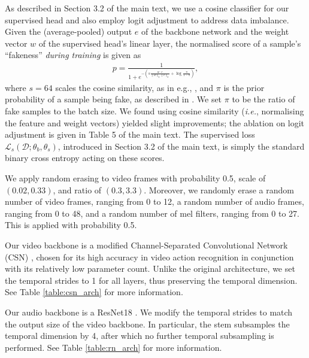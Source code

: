 \documentclass[10pt,twocolumn,letterpaper]{article}
\begin{document}
\begin{description}[wide,itemindent=\labelsep]
\item[Supervised loss details.] As described in Section 3.2 of the main text, we use a cosine classifier for our supervised head and also employ logit adjustment \cite{menon2020long} to address data imbalance. Given the (average-pooled) output $e$ of the backbone network and the weight vector $w$ of the supervised head's linear layer, the normalised score of a sample's ``fakeness'' \textit{during training} is given as 
\begin{align}
    p = \frac{1}{1 + e^{-\left(s\frac{w\cdot e}{\|w\|_2\|e\|_2} + \log\frac{\pi}{1 - \pi}\right)}},
\end{align}
where $s=64$ scales the cosine similarity, as in e.g., \cite{wang2017normface}, and $\pi$ is the prior probability of a sample being fake, as described in \cite{menon2020long}. We set $\pi$ to be the ratio of fake samples to the batch size. We found using cosine similarity (\textit{i.e.}, normalising the feature and weight vectors) yielded slight improvements; the ablation on logit adjustment is given in Table 5 of the main text. The supervised loss $\mathcal{L}_s(\mathcal{D}; \theta_b, \theta_s)$, introduced in Section 3.2 of the main text, is simply the standard binary cross entropy acting on these scores.

\item[Random masking.] We apply random erasing to video frames with probability 0.5, scale of $(0.02, 0.33)$, and ratio of $(0.3, 3.3)$. Moreover, we randomly erase a random number of video frames, ranging from 0 to 12, a random number of audio frames, ranging from 0 to 48, and a random number of mel filters, ranging from 0 to 27. This is applied with probability 0.5.

\item[Backbones.] Our video backbone is a modified Channel-Separated Convolutional Network (CSN) \cite{tran2019video}, chosen for its high accuracy in video action recognition \cite{tran2019video} in conjunction with its relatively low parameter count. Unlike the original architecture, we set the temporal strides to 1 for all layers, thus preserving the temporal dimension. See Table \ref{table:csn_arch} for more information.

Our audio backbone is a ResNet18 \cite{he2016deep}. We modify the temporal strides to match the output size of the video backbone. In particular, the stem subsamples the temporal dimension by 4, after which no further temporal subsampling is performed. See Table \ref{table:rn_arch} for more information.


\end{description}
\end{document}
